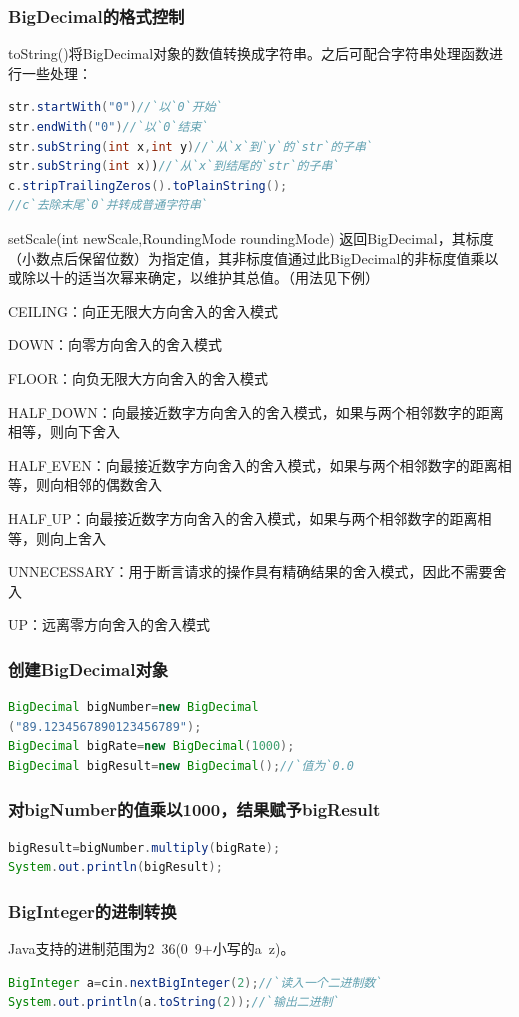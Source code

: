 \documentclass[UTF8,a4paper,titlepage]{ctexart}
\begin{document}
\subsubsection{BigDecimal的格式控制}
 toString()将BigDecimal对象的数值转换成字符串。之后可配合字符串处理函数进行一些处理：
\begin{lstlisting}[language=Java]
str.startWith("0")//`以`0`开始`
str.endWith("0")//`以`0`结束`
str.subString(int x,int y)//`从`x`到`y`的`str`的子串`
str.subString(int x))//`从`x`到结尾的`str`的子串`
c.stripTrailingZeros().toPlainString();
//c`去除末尾`0`并转成普通字符串`
\end{lstlisting}
setScale(int newScale,RoundingMode roundingMode) 返回BigDecimal，其标度（小数点后保留位数）为指定值，其非标度值通过此BigDecimal的非标度值乘以或除以十的适当次幂来确定，以维护其总值。（用法见下例）\par
CEILING：向正无限大方向舍入的舍入模式\par
DOWN：向零方向舍入的舍入模式\par
FLOOR：向负无限大方向舍入的舍入模式\par
HALF$\_$DOWN：向最接近数字方向舍入的舍入模式，如果与两个相邻数字的距离相等，则向下舍入\par
HALF$\_$EVEN：向最接近数字方向舍入的舍入模式，如果与两个相邻数字的距离相等，则向相邻的偶数舍入\par
HALF$\_$UP：向最接近数字方向舍入的舍入模式，如果与两个相邻数字的距离相等，则向上舍入\par
UNNECESSARY：用于断言请求的操作具有精确结果的舍入模式，因此不需要舍入\par
UP：远离零方向舍入的舍入模式
            \subsubsection{创建BigDecimal对象}
\begin{lstlisting}[language=Java]
BigDecimal bigNumber=new BigDecimal
("89.1234567890123456789");
BigDecimal bigRate=new BigDecimal(1000);
BigDecimal bigResult=new BigDecimal();//`值为`0.0
\end{lstlisting}
            \subsubsection{对bigNumber的值乘以1000，结果赋予bigResult}
\begin{lstlisting}[language=Java]
bigResult=bigNumber.multiply(bigRate);
System.out.println(bigResult);
\end{lstlisting}
            \subsubsection{BigInteger的进制转换}
        Java支持的进制范围为2~36(0~9+小写的a~z)。
\begin{lstlisting}[language=Java]
BigInteger a=cin.nextBigInteger(2);//`读入一个二进制数`
System.out.println(a.toString(2));//`输出二进制`
\end{lstlisting}
\end{document}
